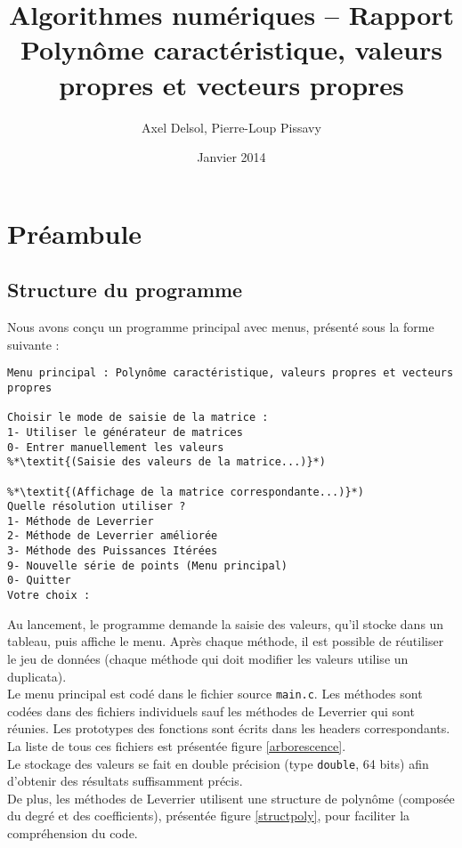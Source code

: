 \documentclass{report}
\title{Algorithmes numériques -- Rapport \\ \vspace{0.5cm}Polynôme caractéristique, valeurs propres et vecteurs propres}
\author{Axel Delsol, Pierre-Loup Pissavy}
\date{Janvier 2014}
\begin{document}
  \maketitle
  \tableofcontents
  
  \chapter{Préambule}
    \section{Structure du programme}
    Nous avons conçu un programme principal avec menus, présenté sous la forme suivante :
      \begin{lstlisting}[style=apercu, name=Menu Principal]
Menu principal : Polynôme caractéristique, valeurs propres et vecteurs propres

Choisir le mode de saisie de la matrice : 
1- Utiliser le générateur de matrices
0- Entrer manuellement les valeurs
%*\textit{(Saisie des valeurs de la matrice...)}*)

%*\textit{(Affichage de la matrice correspondante...)}*)
Quelle résolution utiliser ?
1- Méthode de Leverrier
2- Méthode de Leverrier améliorée
3- Méthode des Puissances Itérées
9- Nouvelle série de points (Menu principal)
0- Quitter
Votre choix :
      \end{lstlisting}
      
      Au lancement, le programme demande la saisie des valeurs, qu'il stocke dans un tableau, puis affiche le menu. Après chaque méthode, il est possible de réutiliser le jeu de données (chaque méthode qui doit modifier les valeurs utilise un duplicata). \\

Le menu principal est codé dans le fichier source \verb"main.c". Les méthodes sont codées dans des fichiers individuels sauf les méthodes de Leverrier qui sont réunies. Les prototypes des fonctions sont écrits dans les headers correspondants. 
La liste de tous ces fichiers est présentée figure \ref{arborescence}.\\

Le stockage des valeurs se fait en double précision (type \verb"double", 64 bits) afin d'obtenir des résultats suffisamment précis.\\
De plus, les méthodes de Leverrier utilisent une structure de polynôme (composée du degré et des coefficients), présentée figure \ref{structpoly}, pour faciliter la compréhension du code.
\end{document}
